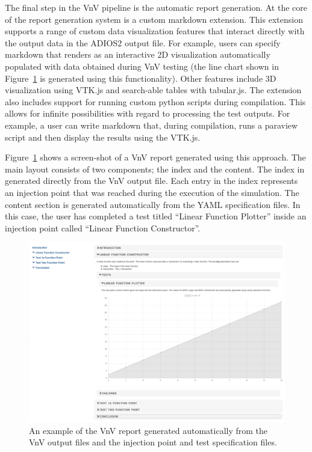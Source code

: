 The final step in the VnV pipeline is the automatic report generation. At the core of the report generation system is a custom markdown extension. This extension supports a range of custom data visualization features that interact directly with the output data in the ADIOS2 output file. For example, users can specify markdown that renders as an interactive 2D visualization automatically populated with data obtained during VnV testing (the line chart shown in  Figure~\ref{rendered-example} is generated using this functionality). Other features include 3D visualization using VTK.js and search-able tables with tabular.js. The extension also includes support for running custom python scripts during compilation. This allows for infinite possibilities with regard to processing the test outputs. For example, a user can write markdown that, during compilation, runs a paraview script and then display the results using the VTK.js.   

Figure~\ref{rendered-example} shows a screen-shot of a VnV report generated using this approach. The main layout consists of two components; the index and the content. The index in generated directly from the VnV output file. Each entry in the index represents an injection point that was reached during the execution of the simulation. The content section is generated automatically from the YAML specification files. In this case, the user has completed a test titled ``Linear Function Plotter'' inside an injection point called ``Linear Function Constructor''.  

\begin{figure}
 \includegraphics[width=\textwidth]{./narrative/figures/render-example.PNG}
\caption{ An example of the VnV report generated automatically from the VnV output files and the injection point and test specification files. \label{rendered-example}}
\end{figure}
 
